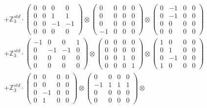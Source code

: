\documentclass{article}
\begin{document}
{\begin{align}
        &+ \label{Rs1-Rc16-Solution-2-c12} \mathbb{Z}_3^{std} \cdot 
            \begin{pmatrix} 0 & 0 & 0 & 0 \\ 0 & 0 & 1 & 1 \\ 0 & 0 & -1 & -1 \\ 0 & 0 & 0 & 0 \end{pmatrix} \otimes 
            \begin{pmatrix} 0 & 0 & 0 & 0 \\ 0 & 0 & 0 & 0 \\ 0 & 0 & 0 & 0 \\ -1 & 0 & 0 & 0 \end{pmatrix} \otimes 
            \begin{pmatrix} 0 & -1 & 0 & 0 \\ 0 & -1 & 0 & 0 \\ 0 & 0 & 0 & 0 \\ 0 & 0 & 0 & 0 \end{pmatrix} \\ 
        &+ \label{Rs1-Rc16-Solution-2-c13} \mathbb{Z}_3^{std} \cdot 
            \begin{pmatrix} -1 & 0 & 0 & 1 \\ 0 & -1 & -1 & 0 \\ 0 & 0 & 0 & 0 \\ 0 & 0 & 0 & 0 \end{pmatrix} \otimes 
            \begin{pmatrix} 0 & 0 & 0 & 0 \\ 0 & 0 & 0 & 0 \\ 0 & 0 & 1 & 0 \\ 0 & 0 & 0 & 1 \end{pmatrix} \otimes 
            \begin{pmatrix} 1 & 0 & 0 & 0 \\ 0 & 1 & 0 & 0 \\ 0 & -1 & 0 & 0 \\ 1 & 0 & 0 & 0 \end{pmatrix} \\ 
        &+ \label{Rs1-Rc16-Solution-2-c14} \mathbb{Z}_3^{std} \cdot 
            \begin{pmatrix} 0 & 0 & 0 & 0 \\ 0 & 0 & 0 & 0 \\ 0 & -1 & 0 & 0 \\ 0 & 1 & 0 & 0 \end{pmatrix} \otimes 
            \begin{pmatrix} 0 & 0 & 0 & 0 \\ -1 & 1 & 1 & 1 \\ 0 & 0 & 0 & 0 \\ 0 & 0 & 0 & 0 \end{pmatrix} \otimes 

\end{align}}
\end{document}
